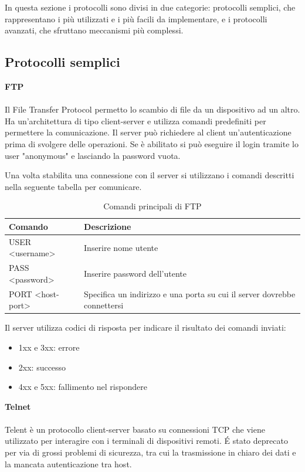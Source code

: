 \documentclass[12pt]{report}
\begin{document}
In questa sezione i protocolli sono divisi in due categorie: protocolli semplici, che rappresentano i più utilizzati e i più facili da implementare, e i protocolli avanzati, che sfruttano meccanismi più complessi.

\subsection{Protocolli semplici}

\textbf{FTP}
\\\\
Il File Transfer Protocol permetto lo scambio di file da un dispositivo ad un altro. Ha un'architettura di tipo client-server e utilizza comandi predefiniti per permettere la comunicazione. Il server può richiedere al client un'autenticazione prima di svolgere delle operazioni. Se è abilitato si può eseguire il login tramite lo user "anonymous" e lasciando la password vuota.\cite{rfcFTP}

Una volta stabilita una connessione con il server si utilizzano i comandi descritti nella seguente tabella per comunicare.

\begin{table}[htbp]
\centering
\begin{tabular}{@{}m{4cm}m{10cm}@{}}
\toprule
\textbf{Comando} & \textbf{Descrizione} \\ \midrule
USER <username> & Inserire nome utente \\
PASS <password> & Inserire password dell'utente \\
PORT <host-port> & Specifica un indirizzo e una porta su cui il server dovrebbe connettersi \\ \bottomrule
\end{tabular}
\caption{Comandi principali di FTP}
\label{tab:FTP}
\end{table}
Il server utilizza codici di risposta per indicare il risultato dei comandi inviati:
\begin{itemize}
    \item 1xx e 3xx: errore
    \item 2xx: successo
    \item 4xx e 5xx: fallimento nel rispondere
\end{itemize}
\textbf{Telnet}
\\\\
Telent è un protocollo client-server basato su connessioni TCP che viene utilizzato per interagire con i terminali di dispositivi remoti. \'{E} stato deprecato per via di grossi problemi di sicurezza, tra cui la trasmissione in chiaro dei dati e la mancata autenticazione tra host. \cite{rfcTELNET}
\end{document}
